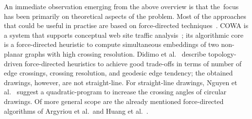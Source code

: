\documentclass[runningheads]{llncs}
\begin{document}
An immediate observation emerging from the above overview is that the~focus has been primarily on theoretical aspects of the problem. Most of the approaches that could be useful in practise are based on force-directed techniques~\cite{DBLP:books/ph/BattistaETT99,DBLP:journals/congnum/Eades84}. COWA is a system that supports conceptual web site traffic analysis~\cite{DBLP:conf/apvis/DidimoLR10}; its algorithmic core is a force-directed heuristic to compute simultaneous embeddings of two non-planar graphs with high crossing resolution. 
%
Didimo et al.~\cite{DBLP:conf/gd/DidimoLR10} describe topology-driven force-directed heuristics to achieve good trade-offs in terms of number of edge crossings, crossing resolution, and geodesic edge tendency; the obtained drawings, however, are not straight-line. 
%
For straight-line drawings, Nguyen et al.~\cite{DBLP:conf/gd/NguyenEHH10} suggest a quadratic-program to increase the crossing angles of circular drawings. 
%
Of more general scope are the already mentioned force-directed algorithms of Argyriou et al.\ and Huang et al.~\cite{DBLP:journals/vlc/HuangEHL13}.


\end{document}
